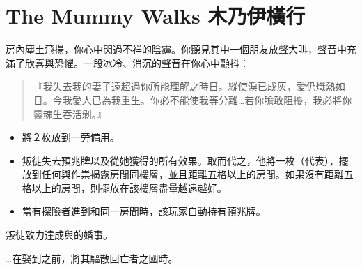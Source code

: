 
\chapter{The Mummy Walks 木乃伊橫行}

\begin{HauntStory}
  房內塵土飛揚，你心中閃過不祥的陰霾。你聽見其中一個朋友放聲大叫，聲音中充滿了欣喜與恐懼。一段冰冷、消沉的聲音在你心中顫抖：

  \begin{quote}
    『我失去我的妻子遠超過你所能理解之時日。縱使淚已成灰，愛仍熾熱如日。今我愛人已為我重生。你必不能使我等分離…若你膽敢阻擾，我必將你靈魂生吞活剝。』
  \end{quote}
\end{HauntStory}

\vspace*{-1em}
\begin{itemize}
  \item 將２枚放到一旁備用。
  \item 叛徒失去預兆牌以及從她獲得的所有效果。取而代之，他將一枚（代表），擺放到任何與作祟揭露房間同樓層，並且距離五格以上的房間。如果沒有距離五格以上的房間，則擺放在該樓層盡量越遠越好。
  \item 當有探險者進到和同一房間時，該玩家自動持有預兆牌。
\end{itemize}


叛徒致力達成與的婚事。


…在娶到之前，將其驅散回亡者之國時。

\vfill\null\pagebreak

